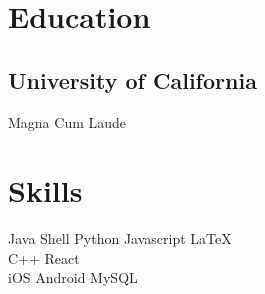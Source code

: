 \documentclass[]{deedy-resume-openfont}
\begin{document}
\begin{minipage}[t]{0.33\textwidth}


\section{Education}

\subsection{University of California}
Magna Cum Laude\\

\sectionsep


\section{Skills}

Java \textbullet{}   Shell \textbullet{} Python \textbullet{} Javascript
\textbullet \LaTeX\ \\
C++ \textbullet{} React \textbullet{} \\

iOS \textbullet{} Android \textbullet{} MySQL
\sectionsep







\end{minipage}
\end{document}
